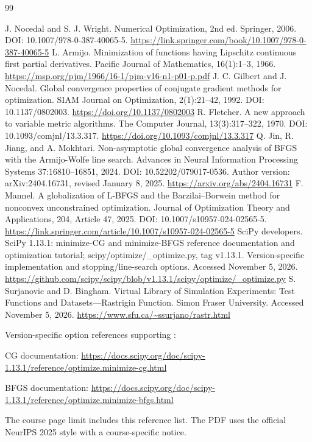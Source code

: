 \documentclass[10pt]{article}
\begin{document}
\newpage
\begin{thebibliography}{99}
\small\raggedright
\setlength{\itemsep}{2pt}
J. Nocedal and S. J. Wright. Numerical Optimization, 2nd ed. Springer, 2006. DOI: 10.1007/978-0-387-40065-5. \url{https://link.springer.com/book/10.1007/978-0-387-40065-5}
L. Armijo. Minimization of functions having Lipschitz continuous first partial derivatives. Pacific Journal of Mathematics, 16(1):1--3, 1966. \url{https://msp.org/pjm/1966/16-1/pjm-v16-n1-p01-p.pdf}
J. C. Gilbert and J. Nocedal. Global convergence properties of conjugate gradient methods for optimization. SIAM Journal on Optimization, 2(1):21--42, 1992. DOI: 10.1137/0802003. \url{https://doi.org/10.1137/0802003}
R. Fletcher. A new approach to variable metric algorithms. The Computer Journal, 13(3):317--322, 1970. DOI: 10.1093/comjnl/13.3.317. \url{https://doi.org/10.1093/comjnl/13.3.317}
Q. Jin, R. Jiang, and A. Mokhtari. Non-asymptotic global convergence analysis of BFGS with the Armijo-Wolfe line search. Advances in Neural Information Processing Systems 37:16810--16851, 2024. DOI: 10.52202/079017-0536. Author version: arXiv:2404.16731, revised January 8, 2025. \url{https://arxiv.org/abs/2404.16731}
F. Mannel. A globalization of L-BFGS and the Barzilai--Borwein method for nonconvex unconstrained optimization. Journal of Optimization Theory and Applications, 204, Article 47, 2025. DOI: 10.1007/s10957-024-02565-5. \url{https://link.springer.com/article/10.1007/s10957-024-02565-5}
SciPy developers. SciPy 1.13.1: minimize-CG and minimize-BFGS reference documentation and optimization tutorial; scipy/optimize/\_optimize.py, tag v1.13.1. Version-specific implementation and stopping/line-search options. Accessed November 5, 2026. \url{https://github.com/scipy/scipy/blob/v1.13.1/scipy/optimize/_optimize.py}
S. Surjanovic and D. Bingham. Virtual Library of Simulation Experiments: Test Functions and Datasets---Rastrigin Function. Simon Fraser University. Accessed November 5, 2026. \url{https://www.sfu.ca/~ssurjano/rastr.html}
\end{thebibliography}
{\small Version-specific option references supporting \cite{ref7}:\par}
{\small\raggedright CG documentation: \url{https://docs.scipy.org/doc/scipy-1.13.1/reference/optimize.minimize-cg.html}\par}
{\small\raggedright BFGS documentation: \url{https://docs.scipy.org/doc/scipy-1.13.1/reference/optimize.minimize-bfgs.html}\par}
{\small The course page limit includes this reference list. The PDF uses the official NeurIPS 2025 style with a course-specific notice.\par}
\end{document}
